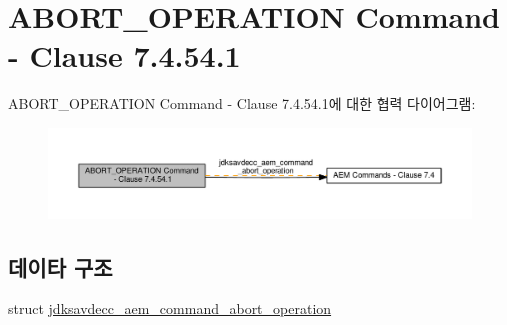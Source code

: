 \hypertarget{group__command__abort__operation}{}\section{A\+B\+O\+R\+T\+\_\+\+O\+P\+E\+R\+A\+T\+I\+ON Command -\/ Clause 7.4.54.1}
\label{group__command__abort__operation}
A\+B\+O\+R\+T\+\_\+\+O\+P\+E\+R\+A\+T\+I\+ON Command -\/ Clause 7.4.54.1에 대한 협력 다이어그램\+:
\nopagebreak
\begin{figure}[H]
\begin{center}
\leavevmode
\includegraphics[width=350pt]{group__command__abort__operation}
\end{center}
\end{figure}
\subsection*{데이타 구조}
\begin{DoxyCompactItemize}
\item 
struct \hyperlink{structjdksavdecc__aem__command__abort__operation}{jdksavdecc\+\_\+aem\+\_\+command\+\_\+abort\+\_\+operation}
\end{DoxyCompactItemize}
